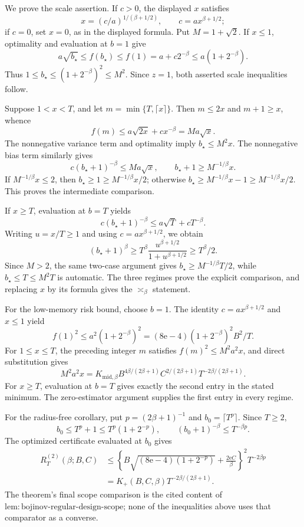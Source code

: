 We prove the scale assertion.  If \(c>0\), the displayed \(x\) satisfies
\[
 x=(c/a)^{1/(\beta+1/2)},
 \qquad c=ax^{\beta+1/2};
\]
if \(c=0\), set \(x=0\), as in the displayed formula.  Put \(M=1+\sqrt2\).  If \(x\le1\), optimality and evaluation at \(b=1\) give
\[
 a\sqrt{b_\star}\le f(b_\star)\le f(1)
 =a+c2^{-\beta}\le a(1+2^{-\beta}).
\]
Thus \(1\le b_\star\le(1+2^{-\beta})^2\le M^2\).  Since \(z=1\), both asserted scale inequalities follow.

Suppose \(1<x<T\), and let \(m=\min\{T,\lceil x\rceil\}\).  Then \(m\le2x\) and \(m+1\ge x\), whence
\[
 f(m)\le a\sqrt{2x}+cx^{-\beta}=Ma\sqrt x.
\]
The nonnegative variance term and optimality imply \(b_\star\le M^2x\).  The nonnegative bias term similarly gives
\[
 c(b_\star+1)^{-\beta}
 \le Ma\sqrt x,
 \qquad
 b_\star+1\ge M^{-1/\beta}x.
\]
If \(M^{-1/\beta}x\le2\), then \(b_\star\ge1\ge M^{-1/\beta}x/2\); otherwise \(b_\star\ge M^{-1/\beta}x-1\ge M^{-1/\beta}x/2\).  This proves the intermediate comparison.

If \(x\ge T\), evaluation at \(b=T\) yields
\[
 c(b_\star+1)^{-\beta}
 \le a\sqrt T+cT^{-\beta}.
\]
Writing \(u=x/T\ge1\) and using \(c=ax^{\beta+1/2}\), we obtain
\[
 (b_\star+1)^\beta
 \ge T^\beta\frac{u^{\beta+1/2}}{1+u^{\beta+1/2}}
 \ge T^\beta/2.
\]
Since \(M>2\), the same two-case argument gives \(b_\star\ge M^{-1/\beta}T/2\), while \(b_\star\le T\le M^2T\) is automatic.  The three regimes prove the explicit comparison, and replacing \(x\) by its formula gives the \(\asymp_\beta\) statement.

For the low-memory risk bound, choose \(b=1\).  The identity \(c=ax^{\beta+1/2}\) and \(x\le1\) yield
\[
 f(1)^2\le a^2(1+2^{-\beta})^2
 =(8\mathrm e-4)(1+2^{-\beta})^2B^2/T.
\]
For \(1\le x\le T\), the preceding integer \(m\) satisfies \(f(m)^2\le M^2a^2x\), and direct substitution gives
\[
 M^2a^2x
 =K_{\mathrm{mid},\beta}
 B^{4\beta/(2\beta+1)}C^{2/(2\beta+1)}
 T^{-2\beta/(2\beta+1)}.
\]
For \(x\ge T\), evaluation at \(b=T\) gives exactly the second entry in the stated minimum.  The zero-estimator argument supplies the first entry in every regime.

For the radius-free corollary, put \(p=(2\beta+1)^{-1}\) and \(b_0=\lceil T^p\rceil\).  Since \(T\ge2\),
\[
 b_0\le T^p+1\le T^p(1+2^{-p}),
 \qquad
 (b_0+1)^{-\beta}\le T^{-\beta p}.
\]
The optimized certificate evaluated at \(b_0\) gives
\[
 \begin{aligned}
 R_T^{(2)}(\beta;B,C)
 &\le\left\{
 B\sqrt{(8\mathrm e-4)(1+2^{-p})}
 +\frac{2\mathrm e C}{\beta}
 \right\}^2T^{-2\beta p}\\
 &=K_+(B,C,\beta)T^{-2\beta/(2\beta+1)}.
 \end{aligned}
\]
The theorem's final scope comparison is the cited content of \(\mathrm{lem{:}bojinov\mbox{-}regular\mbox{-}design\mbox{-}scope}\); none of the inequalities above uses that comparator as a converse.
